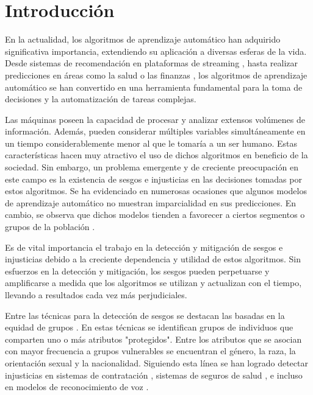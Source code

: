 \chapter*{Introducción}\label{chapter:introduction}

En la actualidad, los algoritmos de aprendizaje autom\'atico han adquirido significativa importancia, extendiendo su aplicaci\'on a diversas 
esferas de la vida. Desde sistemas de recomendaci\'on en plataformas de streaming \parencite{esmaeilzadeh2022abuse, bhattacharya2022augmenting},
hasta realizar predicciones en \'areas como la salud \parencite{roy2023machine} o las finanzas \parencite{sen2021machine}, los algoritmos de 
aprendizaje autom\'atico se han convertido en una herramienta fundamental para la toma de decisiones y la automatizaci\'on de tareas complejas.

Las m\'aquinas poseen la capacidad de procesar y analizar extensos vol\'umenes de informaci\'on. Adem\'as, pueden considerar m\'ultiples variables
simult\'aneamente en un tiempo considerablemente menor al que le tomar\'ia a un ser humano. Estas caracter\'isticas hacen muy atractivo el uso de
dichos algoritmos en beneficio de la sociedad. Sin embargo, un problema emergente y de creciente preocupaci\'on en este campo es la existencia de 
sesgos e injusticias en las decisiones tomadas por estos algoritmos. Se ha evidenciado en numerosas ocasiones que algunos modelos de aprendizaje 
autom\'atico no muestran imparcialidad en sus predicciones. En cambio, se observa que dichos modelos tienden a favorecer a ciertos segmentos 
o grupos de la poblaci\'on \parencite{survey}.
 
Es de vital importancia el trabajo en la detecci\'on y mitigaci\'on de sesgos e injusticias debido a la creciente dependencia y utilidad
de estos algoritmos. Sin esfuerzos en la detecci\'on y mitigaci\'on, los sesgos pueden perpetuarse y amplificarse a medida que los algoritmos se 
utilizan y actualizan con el tiempo, llevando a resultados cada vez m\'as perjudiciales. 

Entre las t\'ecnicas para la detecci\'on de sesgos se destacan las basadas en la equidad de grupos \parencite{fairmodels}. 
En estas t\'ecnicas se identifican grupos de individuos que comparten uno o m\'as atributos "protegidos". Entre los atributos que se asocian con 
mayor frecuencia a grupos vulnerables se encuentran el g\'enero, la raza, la orientaci\'on sexual y la nacionalidad. Siguiendo esta l\'inea se 
han logrado detectar injusticias en sistemas de contrataci\'on \parencite{examples_dis}, sistemas de seguros de salud \parencite{examples_dis}, e incluso 
en modelos de reconocimiento de voz \parencite{voice_bias}.

